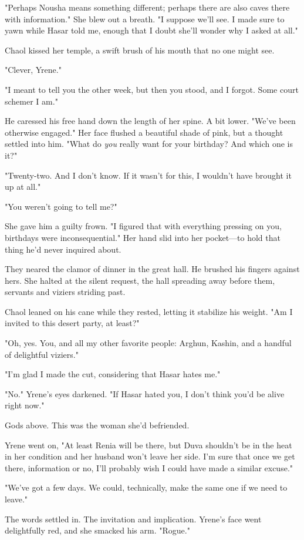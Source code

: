 "Perhaps Nousha means something different; perhaps there are also caves there with information."
She blew out a breath.
"I suppose we'll see.
I made sure to yawn while Hasar told me, enough that I doubt she'll wonder why I asked at all."

Chaol kissed her temple, a swift brush of his mouth that no one might see.

"Clever, Yrene."

"I meant to tell you the other week, but then you stood, and I forgot.
Some court schemer I am."

He caressed his free hand down the length of her spine.
A bit lower.
"We've been otherwise engaged."
Her face flushed a beautiful shade of pink, but a thought settled into him.
"What do \emph{you} really want for your birthday?
And which one is it?"

"Twenty-two.
And I don't know.
If it wasn't for this, I wouldn't have brought it up at all."

"You weren't going to tell me?"

She gave him a guilty frown.
"I figured that with everything pressing on you, birthdays were inconsequential."
Her hand slid into her pocket---to hold that thing he'd never inquired about.

They neared the clamor of dinner in the great hall.
He brushed his fingers against hers.
She halted at the silent request, the hall spreading away before them, servants and viziers striding past.

Chaol leaned on his cane while they rested, letting it stabilize his weight.
"Am I invited to this desert party, at least?"

"Oh, yes.
You, and all my other favorite people: Arghun, Kashin, and a handful of delightful viziers."

"I'm glad I made the cut, considering that Hasar hates me."

"No."
Yrene's eyes darkened.
"If Hasar hated you, I don't think you'd be alive right now."

Gods above.
This was the woman she'd befriended.

Yrene went on, "At least Renia will be there, but Duva shouldn't be in the heat in her condition and her husband won't leave her side.
I'm sure that once we get there, information or no, I'll probably wish I could have made a similar excuse."

"We've got a few days.
We could, technically, make the same one if we need to leave."

The words settled in.
The invitation and implication.
Yrene's face went delightfully red, and she smacked his arm.
"Rogue."

